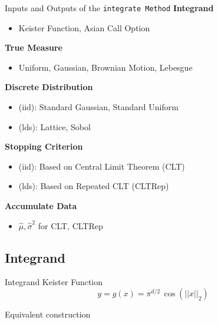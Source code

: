 \documentclass[11pt]{beamer}
\begin{document}
\begin{frame}{Inputs and Outputs of the \tt{integrate} Method}
    \textbf{Integrand}
        \begin{itemize}
            \item Keister Function, Asian Call Option
        \end{itemize}
    \textbf{True Measure}
        \begin{itemize}
            \item Uniform, Gaussian, Brownian Motion, Lebesgue
        \end{itemize}
    \textbf{Discrete Distribution}
        \begin{itemize}
            \item (iid): Standard Gaussian, Standard Uniform
            \item (lds): Lattice, Sobol
        \end{itemize}
    \textbf{Stopping Criterion}
        \begin{itemize}
            \item (iid): Based on Central Limit Theorem (CLT)
            \item (lds): Based on Repeated CLT (CLTRep)
        \end{itemize}
    \textbf{Accumulate Data}
        \begin{itemize}
            \item $\hat{\mu} , \hat{\sigma}^2$ for CLT, CLTRep
        \end{itemize}
\end{frame}

\subsection{Integrand}
\begin{frame}{Integrand}
    Keister Function \cite{keister}
    $$y = g(x) = \pi^{d/2} \, \cos(||x||_2)$$
     
     
     Equivalent construction
     
\end{frame}

\end{document}
